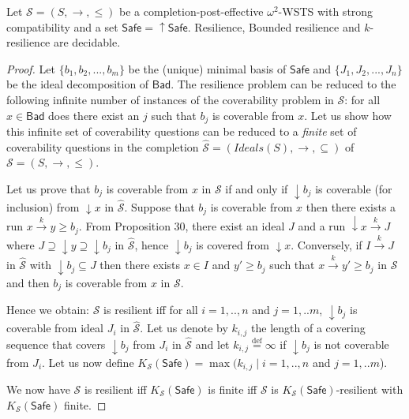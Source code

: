 \documentclass[runningheads]{llncs}
\newcommand{\Bad}{\textsf{Bad}}
\newcommand{\Safe}{\textsf{Safe}}
\begin{document}
%
\begin{theorem}\label{down-up}
Let $\mathscr{S}=(S,\rightarrow, \leq)$ be a completion-post-effective $\omega^2$-WSTS with strong compatibility and a set $\Safe = \uparrow \Safe$.
{\sc Resilience}, {\sc Bounded resilience} 
and {\sc $k$-resilience} are decidable.
\end{theorem}

\begin{proof}
Let  $\{b_1,b_2,...,b_m\}$ be the (unique) minimal basis of $\Safe$ and  $\{J_1, J_2,...,J_n\}$ be the ideal decomposition of $\Bad$.
The resilience problem can be reduced to the following infinite number of instances of the coverability problem in $\mathscr{S}$: for all $x \in \Bad$ does there exist an $j$ such that $b_j$ is coverable from $x$. Let us show how this infinite set of coverability questions can be reduced to a \emph{finite} set of coverability questions in the completion $\hat{\mathscr{S}}=(Ideals(S),\rightarrow, \subseteq)$ of $\mathscr{S}=(S,\rightarrow, \leq)$. 


Let us prove that $b_j$ is coverable from $x$ in $\mathscr{S}$ if and only if $\downarrow b_j$ is coverable (for inclusion) from $\downarrow x$ in $\hat{\mathscr{S}}$.
%
Suppose that $b_j$ is coverable from $x$ then there exists a run $x \xrightarrow{k} y \geq b_j$. From Proposition 30, there exist an ideal $J$ and a run $\downarrow x \xrightarrow{k} J$ where $J \supseteq \downarrow y \supseteq \downarrow b_j$ in $\hat{\mathscr{S}}$, hence $\downarrow b_j$ is covered from $\downarrow x$.
Conversely, if $I \xrightarrow{k} J$ in $\hat{\mathscr{S}}$ with $\downarrow b_j \subseteq J$ then 
there exists $x \in I$ and $y' \geq b_j$ such that $x \xrightarrow{k} y'  \geq b_j$ in $\mathscr{S}$ and then $b_j$ is coverable from $x$ in $\mathscr{S}$.

Hence we obtain: $\mathscr{S}$ is resilient iff for all $i=1,..,n$ and $j= 1,..m$, $\downarrow b_j$ is coverable from ideal $J_i$ in $\hat{\mathscr{S}}$.
%
Let us denote by $k_{i,j}$ the length of a covering sequence that covers $\downarrow b_j$ from $J_i$ in $\hat{\mathscr{S}}$ and let $k_{i,j}\stackrel{\text{def}}{=}\infty$ if $\downarrow b_j$ is not coverable from $J_i$. Let us now define $K_{\mathscr{S}}(\Safe)=\max(k_{i,j} \mid i=1,..,n$ and $j= 1,..m$).
%

%
We now have $\mathscr{S}$ is resilient iff $K_{\mathscr{S}}(\Safe)$ is finite iff $\mathscr{S}$ is $K_{\mathscr{S}}(\Safe)$-resilient with $K_{\mathscr{S}}(\Safe)$ finite.


\end{proof}
\end{document}
